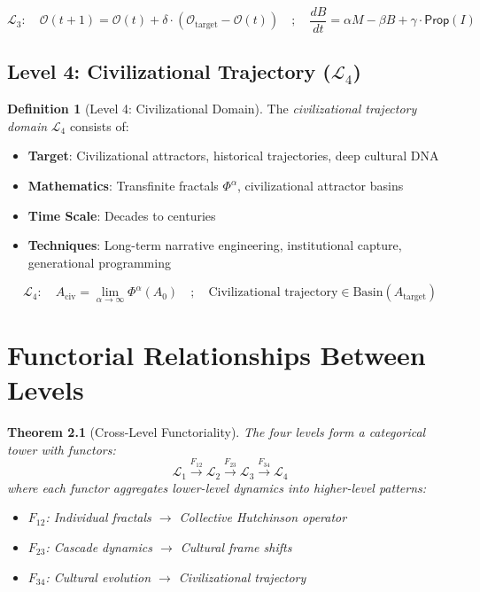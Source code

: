 \documentclass[11pt,twoside]{book}
\theoremstyle{definition}
\newtheorem{definition}{Definition}[chapter]
\theoremstyle{plain}
\newtheorem{theorem}[definition]{Theorem}
\theoremstyle{remark}
\newcommand{\TransFrac}[1]{\Phi^{#1}}
\newcommand{\LevelI}{\mathcal{L}_1}
\newcommand{\LevelII}{\mathcal{L}_2}
\newcommand{\LevelIII}{\mathcal{L}_3}
\newcommand{\LevelIV}{\mathcal{L}_4}
\begin{document}
\begin{equation}
\boxed{
    \LevelIII : \quad \mathcal{O}(t+1) = \mathcal{O}(t) + \delta \cdot (\mathcal{O}_{\mathrm{target}} - \mathcal{O}(t)) \quad ; \quad
    \frac{dB}{dt} = \alpha M - \beta B + \gamma \cdot \mathsf{Prop}(I)
}
\end{equation}

\section{Level 4: Civilizational Trajectory ($\LevelIV$)}

\begin{definition}[Level 4: Civilizational Domain]
\label{def:level4}
The \emph{civilizational trajectory domain} $\LevelIV$ consists of:
\begin{itemize}
    \item \textbf{Target}: Civilizational attractors, historical trajectories, deep cultural DNA
    \item \textbf{Mathematics}: Transfinite fractals $\TransFrac{\alpha}$, civilizational attractor basins
    \item \textbf{Time Scale}: Decades to centuries
    \item \textbf{Techniques}: Long-term narrative engineering, institutional capture, generational programming
\end{itemize}
\end{definition}

\begin{equation}
\boxed{
    \LevelIV : \quad A_{\mathrm{civ}} = \lim_{\alpha \to \infty} \TransFrac{\alpha}(A_0) \quad ; \quad
    \text{Civilizational trajectory} \in \mathrm{Basin}(A_{\mathrm{target}})
}
\end{equation}

\chapter{Functorial Relationships Between Levels}
\label{ch:cogwar-functors}

\begin{theorem}[Cross-Level Functoriality]
\label{thm:cross-level}
The four levels form a categorical tower with functors:
\[
    \LevelI \xrightarrow{F_{12}} \LevelII \xrightarrow{F_{23}} \LevelIII \xrightarrow{F_{34}} \LevelIV
\]
where each functor aggregates lower-level dynamics into higher-level patterns:
\begin{itemize}
    \item $F_{12}$: Individual fractals $\to$ Collective Hutchinson operator
    \item $F_{23}$: Cascade dynamics $\to$ Cultural frame shifts
    \item $F_{34}$: Cultural evolution $\to$ Civilizational trajectory
\end{itemize}
\end{theorem}
\end{document}
